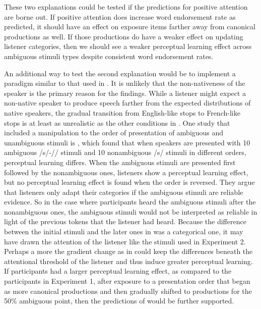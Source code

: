 These two explanations could be tested if the predictions for positive attention are borne out.
If positive attention does increase word endorsement rate as predicted, it should have an effect on exposure items farther away from canonical productions as well.
If those productions do have a weaker effect on updating listener categories, then we should see a weaker perceptual learning effect across ambiguous stimuli types despite consistent word endorsement rates.

An additional way to test the second explanation would be to implement a paradigm similar to that used in \citet{Sumner2011}.  
It is unlikely that the non-nativeness of the speaker is the primary reason for the findings.  
While a listener might expect a non-native speaker to produce speech farther from the expected distributions of native speakers, the gradual transition from English-like stops to French-like stops is at least as unrealistic as the other conditions in \citet{Sumner2011}. 
One study that included a manipulation to the order of presentation of ambiguous and unambiguous stimuli is \citet{Kraljic2008}, which found that when speakers are presented with 10 ambiguous /s/-/\textesh/ stimuli and 10 nonambiguous /s/ stimuli in different orders, perceptual learning differs.  
When the ambiguous stimuli are presented first followed by the nonambiguous ones, listeners show a perceptual learning effect, but no perceptual learning effect is found when the order is reversed.  
They argue that listeners only adapt their categories if the ambiguous stimuli are reliable evidence.  
So in the case where participants heard the ambiguous stimuli after the nonambiguous ones, the ambiguous stimuli would not be interpreted as reliable in light of the previous tokens that the listener had heard.  
Because the difference between the initial stimuli and the later ones in \citet{Kraljic2008} was a categorical one, it may have drawn the attention of the listener like the stimuli used in Experiment 2. 
Perhaps a more the gradient change as in \citet{Sumner2011} could keep the differences beneath the attentional threshold of the listener and thus induce greater perceptual learning.
If participants had a larger perceptual learning effect,  as compared to the participants in Experiment 1, after exposure to a presentation order that began as more canonical productions and then gradually shifted to productions for the 50\% ambiguous point, then the predictions of \citet{Pierrehumbert2002} would be further supported.


